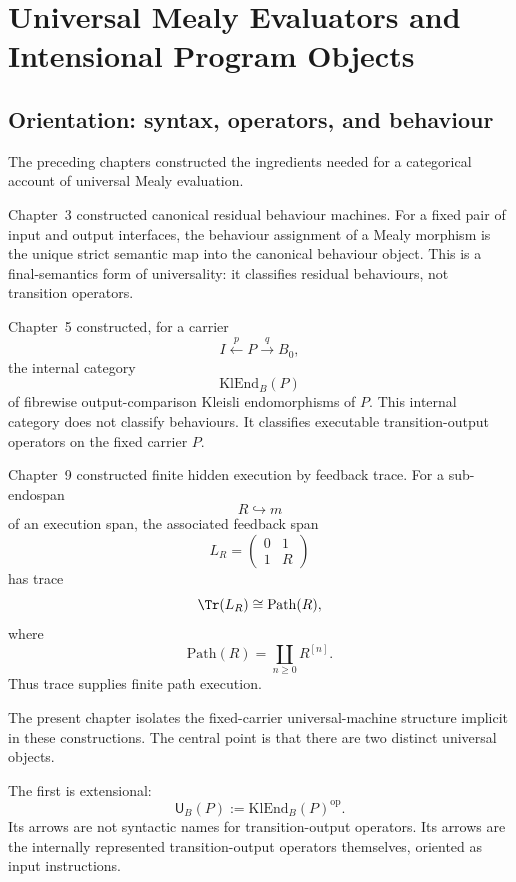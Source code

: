 \chapter{Universal Mealy Evaluators and Intensional Program Objects}
\label{chap:universal-mealy-evaluators}

\section{Orientation: syntax, operators, and behaviour}
\label{sec:universal-mealy-orientation}

The preceding chapters constructed the ingredients needed for a categorical account of universal
Mealy evaluation.

Chapter~3 constructed canonical residual behaviour machines.  For a fixed pair of input and output
interfaces, the behaviour assignment of a Mealy morphism is the unique strict semantic map into the
canonical behaviour object.  This is a final-semantics form of universality: it classifies residual
behaviours, not transition operators.

Chapter~5 constructed, for a carrier
\[
        I \xleftarrow{p} P \xrightarrow{q} B_0 ,
\]
the internal category
\[
        \mathrm{KlEnd}_B(P)
\]
of fibrewise output-comparison Kleisli endomorphisms of \(P\).  This internal category does not
classify behaviours.  It classifies executable transition-output operators on the fixed carrier
\(P\).

Chapter~9 constructed finite hidden execution by feedback trace.  For a sub-endospan
\[
        R\hookrightarrow m
\]
of an execution span, the associated feedback span
\[
        L_R
        =
        \begin{pmatrix}
        0 & 1\\
        1 & R
        \end{pmatrix}
\]
has trace
\[
        \Tr(L_R)\cong \mathrm{Path}(R),
\]
where
\[
        \mathrm{Path}(R)=\coprod_{n\geq 0}R^{[n]}.
\]
Thus trace supplies finite path execution.

The present chapter isolates the fixed-carrier universal-machine structure implicit in these
constructions.  The central point is that there are two distinct universal objects.

The first is extensional:
\[
        \mathsf U_B(P):=\mathrm{KlEnd}_B(P)^{\operatorname{op}}.
\]
Its arrows are not syntactic names for transition-output operators.  Its arrows are the internally
represented transition-output operators themselves, oriented as input instructions.

